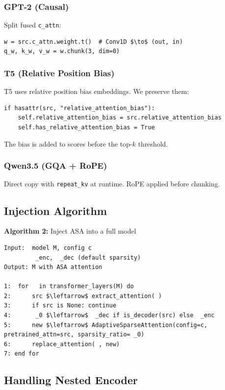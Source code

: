 \subsubsection{GPT-2 (Causal)}

Split fused \texttt{c\_attn}:

\begin{lstlisting}
w = src.c_attn.weight.t()  # Conv1D $\to$ (out, in)
q_w, k_w, v_w = w.chunk(3, dim=0)
\end{lstlisting}

\subsubsection{T5 (Relative Position Bias)}

T5 uses relative position bias embeddings. We preserve them:

\begin{lstlisting}
if hasattr(src, "relative_attention_bias"):
    self.relative_attention_bias = src.relative_attention_bias
    self.has_relative_attention_bias = True
\end{lstlisting}

The bias is added to scores before the top-$k$ threshold.

\subsubsection{Qwen3.5 (GQA + RoPE)}

Direct copy with \texttt{repeat\_kv} at runtime. RoPE applied before chunking.

\subsection{Injection Algorithm}

\textbf{Algorithm 2:} Inject ASA into a full model
\begin{lstlisting}
Input:  model M, config c
         _enc,  _dec (default sparsity)
Output: M with ASA attention

1:  for   in transformer_layers(M) do
2:      src $\leftarrow$ extract_attention( )
3:      if src is None: continue
4:       _0 $\leftarrow$  _dec if is_decoder(src) else  _enc
5:      new $\leftarrow$ AdaptiveSparseAttention(config=c, pretrained_attn=src, sparsity_ratio= _0)
6:      replace_attention( , new)
7: end for
\end{lstlisting}

\subsection{Handling Nested Encoder}

